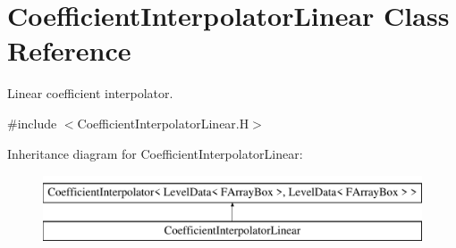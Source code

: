 \hypertarget{class_coefficient_interpolator_linear}{}\section{Coefficient\+Interpolator\+Linear Class Reference}
\label{class_coefficient_interpolator_linear}


Linear coefficient interpolator.  




{\ttfamily \#include $<$Coefficient\+Interpolator\+Linear.\+H$>$}

Inheritance diagram for Coefficient\+Interpolator\+Linear\+:\begin{figure}[H]
\begin{center}
\leavevmode
\includegraphics[height=2.000000cm]{class_coefficient_interpolator_linear}
\end{center}
\end{figure}

